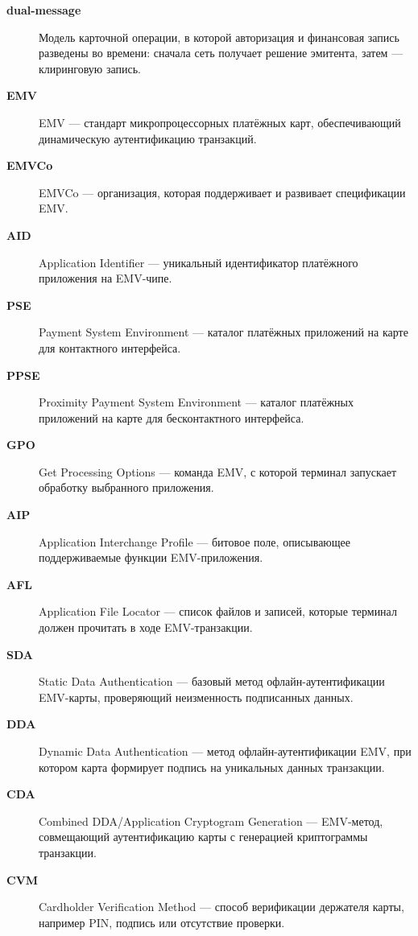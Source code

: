\begin{description}
  \item[\textbf{dual-message}] Модель карточной операции, в которой авторизация и финансовая запись разведены во времени: сначала сеть получает решение эмитента, затем — клиринговую запись.

  \item[\textbf{EMV}] EMV — стандарт микропроцессорных платёжных карт, обеспечивающий динамическую аутентификацию транзакций.

  \item[\textbf{EMVCo}] EMVCo — организация, которая поддерживает и развивает спецификации EMV.

  \item[\textbf{AID}] Application Identifier — уникальный идентификатор платёжного приложения на EMV-чипе.

  \item[\textbf{PSE}] Payment System Environment — каталог платёжных приложений на карте для контактного интерфейса.

  \item[\textbf{PPSE}] Proximity Payment System Environment — каталог платёжных приложений на карте для бесконтактного интерфейса.

  \item[\textbf{GPO}] Get Processing Options — команда EMV, с которой терминал запускает обработку выбранного приложения.

  \item[\textbf{AIP}] Application Interchange Profile — битовое поле, описывающее поддерживаемые функции EMV-приложения.

  \item[\textbf{AFL}] Application File Locator — список файлов и записей, которые терминал должен прочитать в ходе EMV-транзакции.

  \item[\textbf{SDA}] Static Data Authentication — базовый метод офлайн-аутентификации EMV-карты, проверяющий неизменность подписанных данных.

  \item[\textbf{DDA}] Dynamic Data Authentication — метод офлайн-аутентификации EMV, при котором карта формирует подпись на уникальных данных транзакции.

  \item[\textbf{CDA}] Combined DDA/Application Cryptogram Generation — EMV-метод, совмещающий аутентификацию карты с генерацией криптограммы транзакции.

  \item[\textbf{CVM}] Cardholder Verification Method — способ верификации держателя карты, например PIN, подпись или отсутствие проверки.


\end{description}
